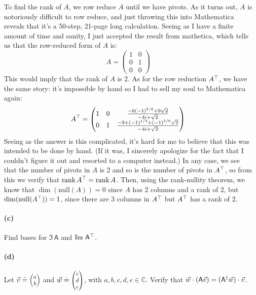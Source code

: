 \documentclass{article}
\begin{document}
\begin{solution}
	To find the rank of $A$, we row reduce $A$ until we have pivots. As it turns out, $A$ is notoriously
	difficult to row reduce, and just throwing this into Mathematica reveals that it's a 50-step, 21-page long
	calculation. Seeing as I have a finite amount of time and sanity, I just accepted the result from mathetica, 
	which tells us that the row-reduced form of $A$ is: 
	\[
		A = \begin{pmatrix} 1 &0\\0&1\\0&0 \end{pmatrix} 
	\] 
	This would imply that the rank of $A$ is 2. As for the row reduction $A^\top$, we have the same story: it's impossible by hand so 
	I had to sell my soul to Mathematica again:  
	\[
		A^\top = \begin{pmatrix} 1 & 0 & \frac{-6(-1)^{5 / 6} + 9\sqrt{2}}{-4i + \sqrt{2}}\\
		0&1&\frac{-9 + (-1)^{1 / 3} + (-1)^{5 / 6} \sqrt{2}}{-4i + \sqrt{2}} \end{pmatrix} 
	\] 
	Seeing as the answer is this complicated, it's hard for me to believe that this was intended to be done by
	hand. (If it was, I sincerely apologize for the fact that I couldn't figure it out and resorted to a computer instead.) In any case, we see that the number of pivots in $A$ is 2 and so is the number of pivots in $A^\top$, 
	so from this we verify that $\rank A^\top = \rank A$. Then, using the rank-nullity theorem, we know that 
	$\dim(\mathrm{null} (A) ) = 0$ since $A$ has 2 columns and a rank of 2, but $\dim(\mathrm{null} (A^\top)) = 1$, since there are 
	3 columns in $A^\top$ but $A^\top$ has a rank of 2.
\end{solution}

\paragraph{(c)}		\extrapart
Find bases for $\Im\,\mathsf{A}$ and $\operatorname{Im}\,\mathsf{A}^{\top}$.


\paragraph{(d)}		
Let $\vec{v}\doteq \smtwovect{a}{b}$ and $\vec{w} \doteq \smthreevect{c}{d}{e}$, with $a,b,c,d,e\in\mathbb{C}$.  
Verify that $\vec{w}\cdot(\mathsf{A}\vec{v}) = (\mathsf{A}^{\dagger}\vec{w})\cdot\vec{v}$.
\end{document}
